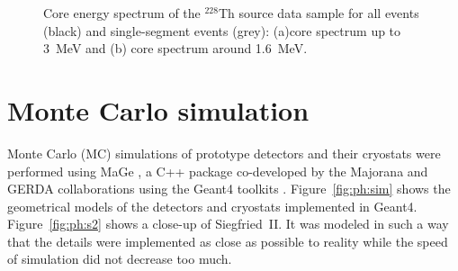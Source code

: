\begin{figure}[htbp]
\centering
{}%
%
\caption{Core energy spectrum of the $^{228}$Th source data sample for
all events (black) and single-segment events (grey): (a)core spectrum
up to 3~MeV and (b) core spectrum around 1.6~MeV.}
\label{fig:ph:seg}
\end{figure}

\section{Monte Carlo simulation}
\label{sec:ph:sim}
Monte Carlo (MC) simulations of prototype detectors and their
cryostats were performed using MaGe \cite{Mag06, Mag08}, a C++ package
co-developed by the Majorana and GERDA collaborations using the Geant4
toolkits \cite{Gea03, Gea06}. Figure~\ref{fig:ph:sim} shows the
geometrical models of the detectors and cryostats implemented in
Geant4. Figure~\ref{fig:ph:s2} shows a close-up of Siegfried~II. It
was modeled in such a way that the details were implemented as close
as possible to reality while the speed of simulation did not decrease
too much.
 
